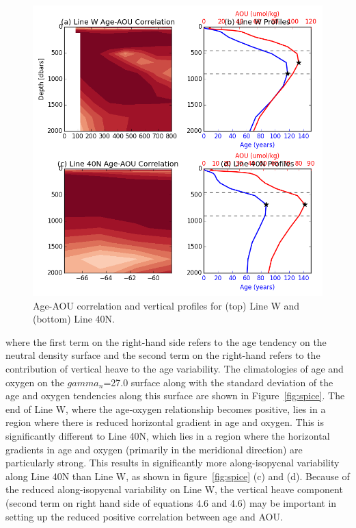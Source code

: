 \begin{figure}
\centering
\includegraphics[width=\linewidth]{age_aou_corr_linew_line40N.png}
\caption{Age-AOU correlation and vertical profiles for (top) Line W and (bottom) Line 40N.}
\label{fig:vertical_profile}
\end{figure}

where the first term on the right-hand side refers to the age tendency on the
neutral density surface and the second term on the right-hand refers to the
contribution of vertical heave to the age variability. The climatologies of age
and oxygen on the $gamma_n$=27.0 surface along with the standard deviation of the age
and oxygen tendencies along this surface are shown in Figure~\ref{fig:spice}.
The end of Line W, where the age-oxygen relationship becomes positive, lies in a
region where there is reduced horizontal gradient in age and oxygen. This is
significantly different to Line 40N, which lies in a region where the horizontal
gradients in age and oxygen (primarily in the meridional direction) are
particularly strong. This results in significantly more along-isopycnal variability
along Line 40N than Line W, as shown in figure~\ref{fig:spice} (c) and (d).
Because of the reduced along-isopycnal variability on Line W, the vertical heave
component (second term on right hand side of equations 4.6 and 4.6) may be important
in setting up the reduced positive correlation between age and AOU.

